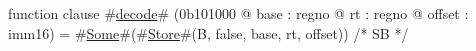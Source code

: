 function clause #\hyperref[zdecode]{decode}# (0b101000 @ base : regno @ rt : regno @ offset : imm16) =
  #\hyperref[zSome]{Some}#(#\hyperref[zStore]{Store}#(B, false, base, rt, offset)) /* SB */
